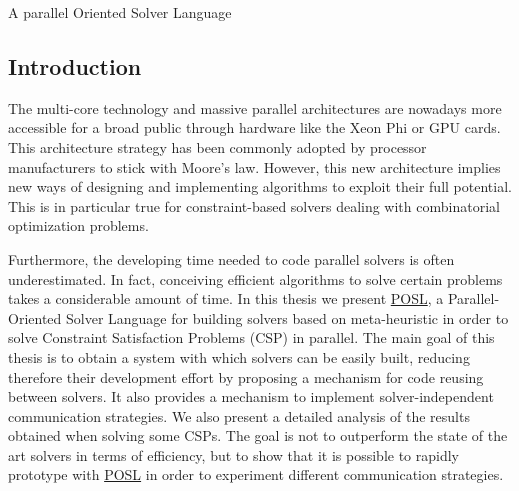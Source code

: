 A parallel Oriented Solver Language

\subsection*{Introduction }

The multi-\/core technology and massive parallel architectures are nowadays more accessible for a broad public through hardware like the Xeon Phi or G\+PU cards. This architecture strategy has been commonly adopted by processor manufacturers to stick with Moore’s law. However, this new architecture implies new ways of designing and implementing algorithms to exploit their full potential. This is in particular true for constraint-\/based solvers dealing with combinatorial optimization problems.

Furthermore, the developing time needed to code parallel solvers is often underestimated. In fact, conceiving efficient algorithms to solve certain problems takes a considerable amount of time. In this thesis we present \hyperlink{namespacePOSL}{P\+O\+SL}, a Parallel-\/\+Oriented Solver Language for building solvers based on meta-\/heuristic in order to solve Constraint Satisfaction Problems (C\+SP) in parallel. The main goal of this thesis is to obtain a system with which solvers can be easily built, reducing therefore their development effort by proposing a mechanism for code reusing between solvers. It also provides a mechanism to implement solver-\/independent communication strategies. We also present a detailed analysis of the results obtained when solving some C\+S\+Ps. The goal is not to outperform the state of the art solvers in terms of efficiency, but to show that it is possible to rapidly prototype with \hyperlink{namespacePOSL}{P\+O\+SL} in order to experiment different communication strategies. 